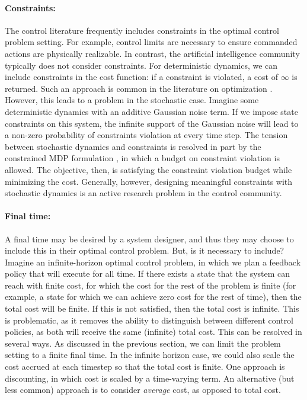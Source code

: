 \paragraph{Constraints:} The control literature frequently includes constraints in the optimal control problem setting. For example, control limits are necessary to ensure commanded actions are physically realizable. In contrast, the artificial intelligence community typically does not consider constraints. For deterministic dynamics, we can include constraints in the cost function: if a constraint is violated, a cost of $\infty$ is returned. Such an approach is common in the literature on optimization \cite{boyd2004convex}. However, this leads to a problem in the stochastic case. Imagine some deterministic dynamics with an additive Gaussian noise term. If we impose state constraints on this system, the infinite support of the Gaussian noise will lead to a non-zero probability of constraints violation at every time step. The tension between stochastic dynamics and constraints is resolved in part by the constrained MDP formulation \cite{altman1999constrained}, in which a budget on constraint violation is allowed. The objective, then, is satisfying the constraint violation budget while minimizing the cost. Generally, however, designing meaningful constraints with stochastic dynamics is an active research problem in the control community. 

\paragraph{Final time:} A final time may be desired by a system designer, and thus they may choose to include this in their optimal control problem. But, is it necessary to include? Imagine an infinite-horizon optimal control problem, in which we plan a feedback policy that will execute for all time. If there exists a state that the system can reach with finite cost, for which the cost for the rest of the problem is finite (for example, a state for which we can achieve zero cost for the rest of time), then the total cost will be finite. If this is not satisfied, then the total cost is infinite. This is problematic, as it removes the ability to distinguish between different control policies, as both will receive the same (infinite) total cost. This can be resolved in several ways. As discussed in the previous section, we can limit the problem setting to a finite final time. In the infinite horizon case, we could also scale the cost accrued at each timestep so that the total cost is finite. One approach is discounting, in which cost is scaled by a time-varying term. An alternative (but less common) approach is to consider \textit{average} cost, as opposed to total cost. 


